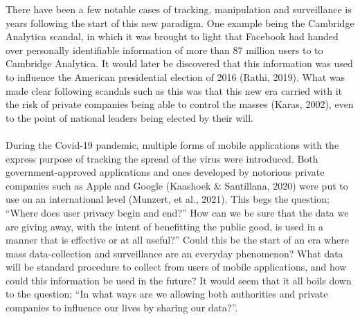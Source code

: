 \documentclass[11pt]{article}
\begin{document}
There have been a few notable cases of tracking, manipulation and surveillance is years following the start of this new paradigm. One example being the Cambridge Analytica scandal, in which it was brought to light that Facebook had handed over personally identifiable information of more than 87 million users to to Cambridge Analytica. It would later be discovered that this information was used to influence the American presidential election of 2016 (Rathi, 2019). What was made clear following scandals such as this was that this new era carried with it the risk of private companies being able to control the masses (Karas, 2002), even to the point of national leaders being elected by their will. \\ \\

During the Covid-19 pandemic, multiple forms of mobile applications with the express purpose of tracking the spread of the virus were introduced. Both government-approved applications and ones developed by notorious private companies such as Apple and Google (Kaashoek \& Santillana, 2020) were put to use on an international level (Munzert, et al., 2021). This begs the question; “Where does user privacy begin and end?” How can we be sure that the data we are giving away, with the intent of benefitting the public good, is used in a manner that is effective or at all useful?” Could this be the start of an era where mass data-collection and surveillance are an everyday phenomenon? What data will be standard procedure to collect from users of mobile applications, and how could this information be used in the future? It would seem that it all boils down to the question; “In what ways are we allowing both authorities and private companies to influence our lives by sharing our data?”. 



\end{document}
